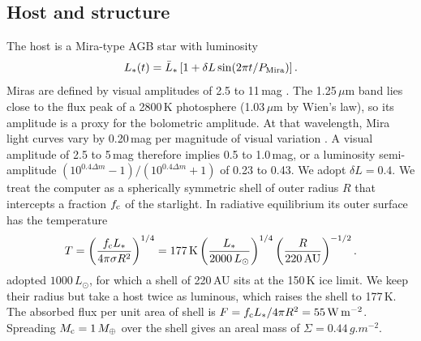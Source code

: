 \documentclass[final,5p]{elsarticle}
\newcommand{\Lsun}{L_\odot}
\newcommand{\Mearth}{M_\oplus}
\begin{document}
\subsection{Host and structure}\label{sec:host}
The host is a Mira-type AGB star \citep{HofnerOlofsson2018} with luminosity
\iftwocol{} \fi   %
\begin{equation}
L_\ast(t)=\bar L_\ast\left[1+\delta L\sin(2\pi t/P_{\rm Mira})\right].
\end{equation}
\iftwocol{} \fi
Miras are defined by visual amplitudes of 2.5 to 11\,mag \citep{Samus2017}. The 1.25\,$\mu$m band lies close to the flux peak of a 2800\,K photosphere (1.03\,$\mu$m by Wien's law), so its amplitude is a proxy for the bolometric amplitude. At that wavelength, Mira light curves vary by 0.20\,mag per magnitude of visual variation \citep{Smith2002}. A visual amplitude of 2.5 to 5\,mag therefore implies 0.5 to 1.0\,mag, or a luminosity semi-amplitude $(10^{0.4\Delta m}-1)/(10^{0.4\Delta m}+1)$ of 0.23 to 0.43. We adopt $\delta L=0.4$. We treat the computer as a spherically symmetric shell of outer radius $R$ that intercepts a fraction $f_{\rm c}$ of the starlight. In radiative equilibrium its outer surface has the temperature
\begin{equation}
T = \left(\frac{f_{\rm c}L_\ast}{4\pi\sigma R^2}\right)^{1/4} = 177\,{\rm K}\left(\frac{L_\ast}{2000\,\Lsun}\right)^{1/4}\left(\frac{R}{220\,{\rm AU}}\right)^{-1/2}.
\end{equation}
\citet{LaughlinAdams2021} adopted $1000\,\Lsun$, for which a shell of 220\,AU sits at the 150\,K ice limit. We keep their radius but take a host twice as luminous, which raises the shell to 177\,K. The absorbed flux per unit area of shell is $F=f_{\rm c}L_\ast/4\pi R^2=55\,\si{W.m^{-2}}$. Spreading $M_{\rm c}=1\,\Mearth$ over the shell gives an areal mass of $\Sigma=0.44\,\si{g.m^{-2}}$.
\end{document}
